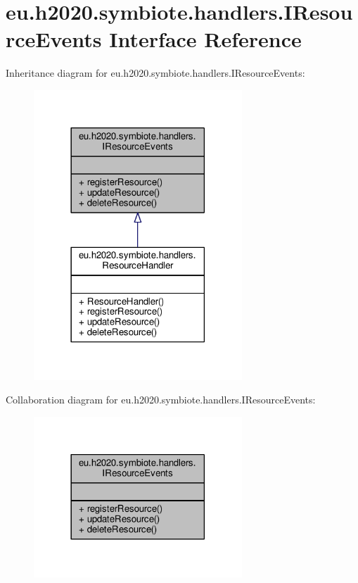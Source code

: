 \hypertarget{interfaceeu_1_1h2020_1_1symbiote_1_1handlers_1_1IResourceEvents}{}\section{eu.\+h2020.\+symbiote.\+handlers.\+I\+Resource\+Events Interface Reference}
\label{interfaceeu_1_1h2020_1_1symbiote_1_1handlers_1_1IResourceEvents}


Inheritance diagram for eu.\+h2020.\+symbiote.\+handlers.\+I\+Resource\+Events\+:
\nopagebreak
\begin{figure}[H]
\begin{center}
\leavevmode
\includegraphics[width=222pt]{interfaceeu_1_1h2020_1_1symbiote_1_1handlers_1_1IResourceEvents__inherit__graph}
\end{center}
\end{figure}


Collaboration diagram for eu.\+h2020.\+symbiote.\+handlers.\+I\+Resource\+Events\+:
\nopagebreak
\begin{figure}[H]
\begin{center}
\leavevmode
\includegraphics[width=222pt]{interfaceeu_1_1h2020_1_1symbiote_1_1handlers_1_1IResourceEvents__coll__graph}
\end{center}
\end{figure}
